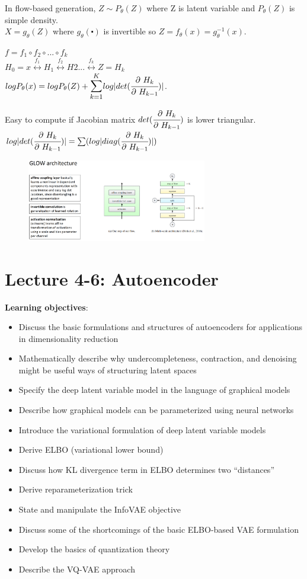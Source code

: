 \documentclass[12pt,a4paper]{article}
\begin{document}
In flow-based generation, $Z\sim P_\theta(Z)$ where Z is latent variable and $P_\theta(Z)$ is simple density. \\
$X=g_\theta(Z)$ where $g_\theta(\centerdot)$ is invertible so $Z=f_\theta(x)=g_\theta^{-1}(x)$. 

$f=f_1\circ f_2 \circ ... \circ f_k$\\
$H_0=x\overset{f_1}{\longleftrightarrow}H_1\overset{f_2}{\longleftrightarrow}H2...\overset{f_k}{\longleftrightarrow}Z=H_k$\\
$logP_\theta(x)=logP_\theta(Z)+\bsum{k=1}{K}log|det(\pfrac{H_k}{H_{k-1}})|$. 

Easy to compute if Jacobian matrix $det(\cfrac{\partial\ H_k}{\partial\ H_{k-1}})$ is lower triangular.\\
$log|det(\cfrac{\partial\ H_k}{\partial\ H_{k-1}})|=\sum(log|diag(\cfrac{\partial\ H_k}{\partial\ H_{k-1}})|)$

\begin{figure}[!ht]
    \centering
    \includegraphics[width=0.7\textwidth]{fig/glow_arch.png}
\end{figure} 


\section{Lecture 4-6: Autoencoder}
\textbf{Learning objectives}:
\begin{itemize}
    \item Discuss the basic formulations and structures of autoencoders for applications in dimensionality reduction
    \item Mathematically describe why undercompleteness, contraction, and denoising might be useful ways of structuring latent spaces
    \item Specify the deep latent variable model in the language of graphical models
    \item Describe how graphical models can be parameterized using neural networks
    \item Introduce the variational formulation of deep latent variable models 
    \item Derive ELBO (variational lower bound)
    \item Discuss how KL divergence term in ELBO determines two “distances”
    \item Derive reparameterization trick
    \item State and manipulate the InfoVAE objective
    \item Discuss some of the shortcomings of the basic ELBO-based VAE formulation
    \item Develop the basics of quantization theory
    \item Describe the VQ-VAE approach
\end{itemize}
\end{document}

